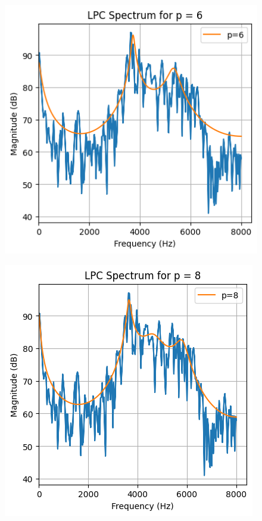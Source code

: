 \documentclass{article}
\begin{document}
\begin{figure}[H]
\begin{center}
\includegraphics[scale = 0.8]{6p2.png}
\end{center}
\end{figure}

\begin{figure}[H]
\begin{center}
\includegraphics[scale = 0.8]{8p2.png}
\end{center}
\end{figure}
\end{document}
